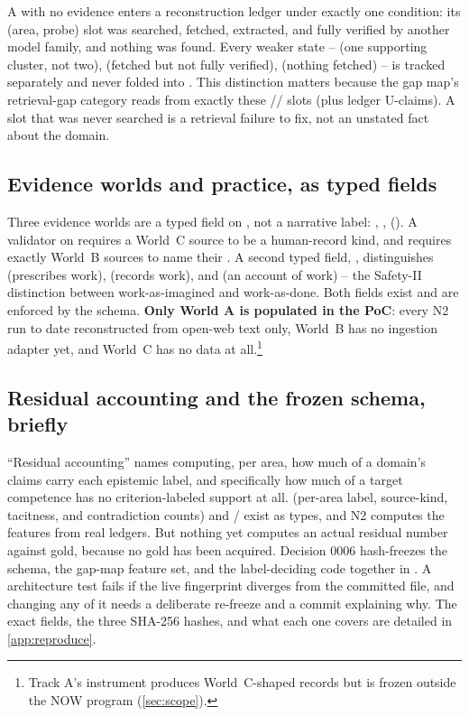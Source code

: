 A  with no evidence enters a reconstruction ledger under exactly one condition:
its (area, probe) slot was searched, fetched, extracted, and fully verified by another model
family, and nothing was found. \evobs{} Every weaker state --  (one supporting cluster,
not two),  (fetched but not fully verified),  (nothing fetched) --
is tracked separately and never folded into . This distinction matters because the
gap map's retrieval-gap category  reads from exactly these //
 slots (plus ledger U-claims). A slot that was never searched is a retrieval
failure to fix, not an unstated fact about the domain.

\subsection{Evidence worlds and practice, as typed fields}

Three evidence worlds are a typed field on , not a narrative label:
, , 
(). \evobs{} A validator on  requires a World~C
source to be a human-record kind, and requires exactly World~B sources to name their
. A second typed field, , distinguishes 
(prescribes work),  (records work), and  (an account of work) -- the
Safety-II distinction between work-as-imagined and work-as-done. Both fields exist and are
enforced by the schema. \textbf{Only World A is populated in the PoC}: every N2 run to date
reconstructed from open-web text only, World~B has no ingestion adapter yet, and World~C has no
data at all.\footnote{Track A's instrument produces World~C-shaped records but is frozen outside
the NOW program (\cref{sec:scope}).}

\subsection{Residual accounting and the frozen schema, briefly}

\enquote{Residual accounting} names computing, per area, how much of a domain's claims carry each
epistemic label, and specifically how much of a target competence has no criterion-labeled support
at all. \evint{}  (per-area label, source-kind, tacitness, and contradiction
counts) and / exist as types, and N2 computes the
features from real ledgers. But nothing yet computes an actual residual number against gold,
because no gold has been acquired. Decision 0006 hash-freezes the schema, the gap-map feature set,
and the label-deciding code together in . A 
architecture test fails if the live fingerprint diverges from the committed file, and changing any
of it needs a deliberate re-freeze and a commit explaining why. The exact fields, the three
SHA-256 hashes, and what each one covers are detailed in \cref{app:reproduce}.
